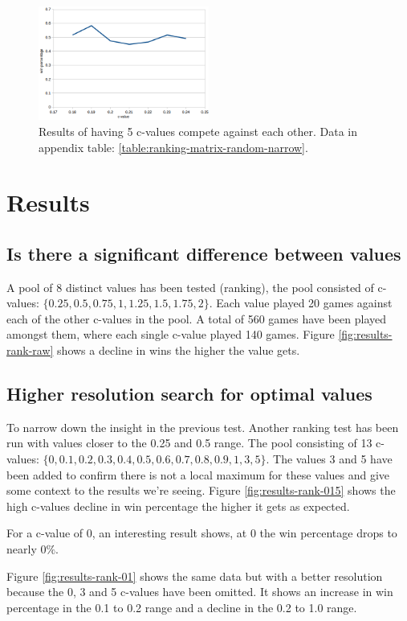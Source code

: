 \documentclass[11pt,a4paper]{article}
\begin{document}
\begin{figure}
	\includegraphics[width=0.5\textwidth]{images/rank-narrow}
	\caption{Results of having 5 c-values compete against each other. Data in appendix table: \ref{table:ranking-matrix-random-narrow}.}
	\label{fig:results-rank-narrow}
\end{figure}

\section{Results}
\subsection{Is there a significant difference between values}
A pool of 8 distinct values has been tested (ranking), the pool consisted of c-values: $\{0.25, 0.5, 0.75, 1, 1.25, 1.5, 1.75, 2\}$. Each value played 20 games against each of the other c-values in the pool. A total of 560 games have been played amongst them, where each single c-value played 140 games. Figure \ref{fig:results-rank-raw} shows a decline in wins the higher the value gets.


\subsection{Higher resolution search for optimal values}
To narrow down the insight in the previous test. Another ranking test has been run with values closer to the 0.25 and 0.5 range. The pool consisting of 13 c-values: $\{0, 0.1, 0.2, 0.3, 0.4, 0.5, 0.6, 0.7, 0.8, 0.9, 1, 3, 5\}$. The values 3 and 5 have been added to confirm there is not a local maximum for these values and give some context to the results we're seeing. Figure \ref{fig:results-rank-015} shows the high c-values decline in win percentage the higher it gets as expected.

For a c-value of 0, an interesting result shows, at 0 the win percentage drops to nearly $0\%$.

Figure \ref{fig:results-rank-01} shows the same data but with a better resolution because the 0, 3 and 5 c-values have been omitted. It shows an increase in win percentage in the 0.1 to 0.2 range and a decline in the 0.2 to 1.0 range.
\end{document}
